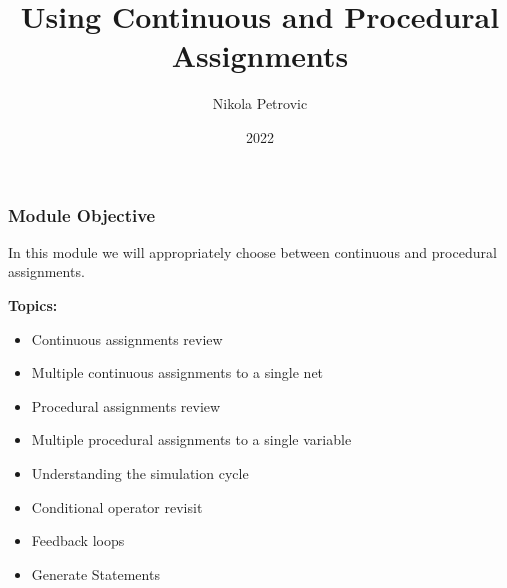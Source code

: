 \documentclass[t, notes, xcolor=table]{beamer}
\title{Using Continuous and Procedural Assignments}
\author{Nikola Petrovic}
\institute{University of Belgrade, School of Electrical Engineering}
\date{2022}
\begin{document}
\frame{\titlepage}

\begin{frame}
\frametitle{Module Objective}

In this module we will appropriately choose between continuous and procedural assignments.
\newline

\textbf{Topics:}
\begin{itemize}
\item Continuous assignments review
\item Multiple continuous assignments to a single net
\item Procedural assignments review
\item Multiple procedural assignments to a single variable
\item Understanding the simulation cycle
\item Conditional operator revisit
\item Feedback loops
\item Generate Statements
\end{itemize}

\end{frame}
\end{document}
